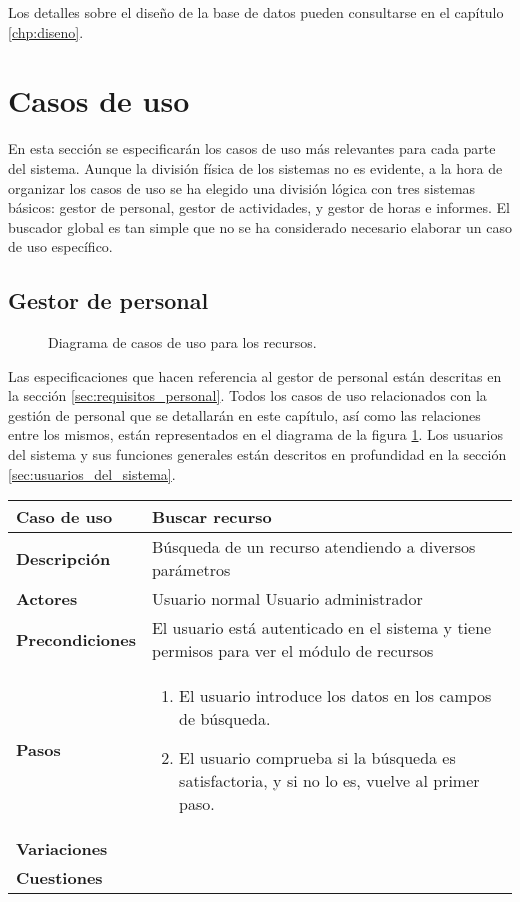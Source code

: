 Los detalles sobre el diseño de la base de datos pueden consultarse en el
capítulo \ref{chp:diseno}.

\section{Casos de uso}
\label{sec:casos_de_uso}

En esta sección se especificarán los casos de uso más relevantes para cada
parte del sistema. Aunque la división física de los sistemas no es evidente, a
la hora de organizar los casos de uso se ha elegido una división lógica con
tres sistemas básicos: gestor de personal, gestor de actividades, y gestor de
horas e informes. El buscador global es tan simple que no se ha considerado
necesario elaborar un caso de uso específico.

\subsection{Gestor de personal}

\begin{figure}
\centering
{}
\caption{Diagrama de casos de uso para los recursos.}
\label{fig:CU_recursos}
\end{figure}

Las especificaciones que hacen referencia al gestor de personal están
descritas en la sección \ref{sec:requisitos_personal}. Todos los casos de uso
relacionados con la gestión de personal que se detallarán en este capítulo, así
como las relaciones entre los mismos, están representados en el diagrama de la
figura \ref{fig:CU_recursos}. Los usuarios del sistema y sus funciones generales
están descritos en profundidad en la sección \ref{sec:usuarios_del_sistema}.

\begin{tabular}{|p{1.25in}|p{3.65in}|}\hline
\textbf{Caso de uso} & \textbf{Buscar recurso}\\\hline\hline
\textbf{Descripción} & Búsqueda de un recurso atendiendo a diversos
parámetros\\\hline
\textbf{Actores} & Usuario normal \newline Usuario administrador\\\hline
\textbf{Precondiciones} & El usuario está autenticado en el sistema y
tiene permisos para ver el módulo de recursos\\\hline
\textbf{Pasos} & 
  \begin{enumerate}
   \item El usuario introduce los datos en los campos de búsqueda.
   \item El usuario comprueba si la búsqueda es satisfactoria, y si no lo es,
vuelve al primer paso.
  \end{enumerate}
\\\hline
\textbf{Variaciones} & \\\hline
\textbf{Cuestiones} & \\\hline
\end{tabular}

